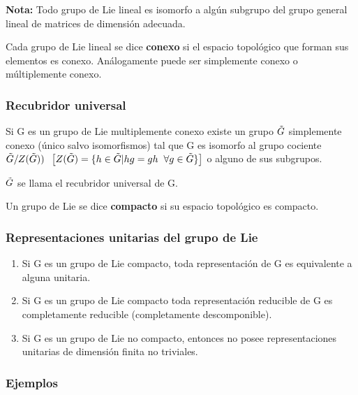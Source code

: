 \documentclass{article}
\begin{document}
\textbf{Nota:} Todo grupo de Lie lineal es isomorfo a algún subgrupo del grupo general lineal de matrices de dimensión adecuada.

\smallskip
Cada grupo de Lie lineal se dice \textbf{conexo} si el espacio topológico que forman sus elementos es conexo. Análogamente puede ser simplemente conexo o múltiplemente conexo.

\subsubsection{Recubridor universal}

Si G es un grupo de Lie multiplemente conexo existe un grupo $\Tilde{G}$ simplemente conexo (único salvo isomorfismos) tal que G es isomorfo al grupo cociente $\Tilde{G}/Z(\Tilde{G})) \hspace{0.2cm} \left [ Z(\Tilde{G})=\lbrace h\in \Tilde{ G} | hg=gh  \hspace{0.2cm} \forall g  \in \Tilde{G} \rbrace\right]$ o alguno de sus subgrupos.

$\Tilde{G}$ se llama el recubridor universal de G.

\smallskip
Un grupo de Lie se dice \textbf{compacto} si su espacio topológico es compacto.

\subsubsection{Representaciones unitarias del grupo de Lie}

\begin{enumerate}
\item Si G es un grupo de Lie compacto, toda representación de G es equivalente a alguna unitaria.

\item Si G es un grupo de Lie compacto toda representación reducible de G es completamente reducible (completamente descomponible).

\item Si G es un grupo de Lie no compacto, entonces no posee representaciones unitarias de dimensión finita no triviales.

\end{enumerate}

\subsubsection{Ejemplos}
\end{document}
